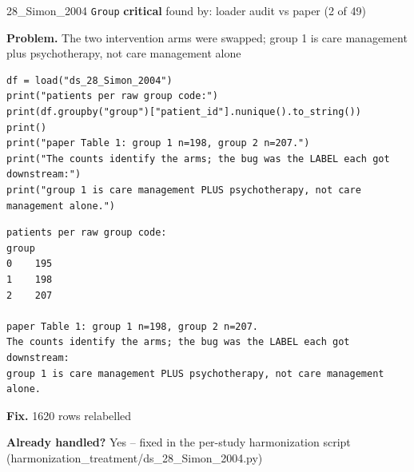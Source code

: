 \documentclass[9pt, t, handout]{beamer}
\newcommand{\ans}[1]{\textcolor{structure.fg}{#1}}
\begin{document}
\begin{frame}[fragile]{28\_Simon\_2004 \quad \texttt{Group}}
  {\scriptsize\textcolor{red!70!black}{\textbf{critical}} \quad
   found by: loader audit vs paper \quad (2 of 49)}
  \vspace{3pt}

  {\footnotesize \textbf{Problem.} The two intervention arms were swapped; group 1 is care management plus psychotherapy, not care management alone}
  \vspace{4pt}

  \begin{Verbatim}[fontsize=\tiny, frame=single, framesep=2pt, label=\tiny reproduce]
df = load("ds_28_Simon_2004")
print("patients per raw group code:")
print(df.groupby("group")["patient_id"].nunique().to_string())
print()
print("paper Table 1: group 1 n=198, group 2 n=207.")
print("The counts identify the arms; the bug was the LABEL each got downstream:")
print("group 1 is care management PLUS psychotherapy, not care management alone.")
  \end{Verbatim}
  \begin{Verbatim}[fontsize=\tiny, frame=single, framesep=2pt, label=\tiny output]
patients per raw group code:
group
0    195
1    198
2    207

paper Table 1: group 1 n=198, group 2 n=207.
The counts identify the arms; the bug was the LABEL each got downstream:
group 1 is care management PLUS psychotherapy, not care management alone.
  \end{Verbatim}
  \vspace{2pt}

  {\footnotesize \textbf{Fix.} 1620 rows relabelled}
  \vspace{2pt}

  {\footnotesize \textbf{Already handled?} \ans{Yes} -- fixed in the per-study harmonization script
   (harmonization\_treatment/ds\_28\_Simon\_2004.py)}
\end{frame}
\end{document}
